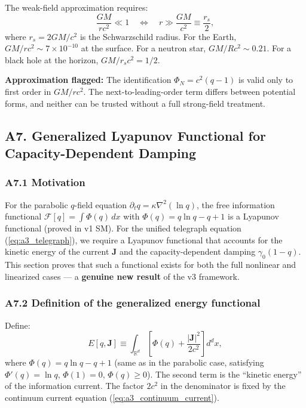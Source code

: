 \documentclass[reprint]{revtex4-2}
\begin{document}
The weak-field approximation requires:
\begin{equation}
\frac{GM}{rc^2} \ll 1 \quad\Longleftrightarrow\quad r \gg \frac{GM}{c^2} \equiv \frac{r_s}{2},
\end{equation}
where $r_s = 2GM/c^2$ is the Schwarzschild radius. For the Earth, $GM/rc^2 \sim 7\times 10^{-10}$ at the surface. For a neutron star, $GM/Rc^2 \sim 0.21$. For a black hole at the horizon, $GM/r_s c^2 = 1/2$.

\textbf{Approximation flagged:} The identification $\Phi_N = c^2(q-1)$ is valid only to first order in $GM/rc^2$. The next-to-leading-order term differs between potential forms, and neither can be trusted without a full strong-field treatment.

\subsection{A7. Generalized Lyapunov Functional for Capacity-Dependent Damping}

\subsubsection{A7.1 Motivation}

For the parabolic $q$-field equation $\partial_t q = \kappa\nabla^2(\ln q)$, the free information functional $\mathcal{F}[q] = \int \Phi(q)\,dx$ with $\Phi(q)=q\ln q - q + 1$ is a Lyapunov functional (proved in v1 SM). For the unified telegraph equation (\ref{eq:a3_telegraph}), we require a Lyapunov functional that accounts for the kinetic energy of the current $\mathbf{J}$ and the capacity-dependent damping $\gamma_0(1-q)$. This section proves that such a functional exists for both the full nonlinear and linearized cases --- a \textbf{genuine new result} of the v3 framework.

\subsubsection{A7.2 Definition of the generalized energy functional}

Define:
\begin{equation}
E[q,\mathbf{J}] \equiv \int_{\mathbb{R}^d} \left[\Phi(q) + \frac{|\mathbf{J}|^2}{2c^2}\right] d^d x,
\label{eq:energy_def}
\end{equation}
where $\Phi(q) = q\ln q - q + 1$ (same as in the parabolic case, satisfying $\Phi'(q)=\ln q$, $\Phi(1)=0$, $\Phi(q)\ge 0$). The second term is the ``kinetic energy'' of the information current. The factor $2c^2$ in the denominator is fixed by the continuum current equation (\ref{eq:a3_continuum_current}).
\end{document}
